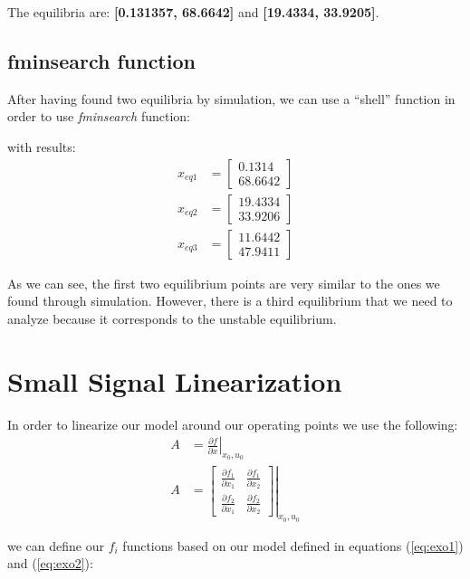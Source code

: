 \documentclass[12pt,letterpaper]{article}
\begin{document}
The equilibria are: \textbf{[0.131357, 68.6642]} and  \textbf{[19.4334, 33.9205]}.
\subsection{fminsearch function}
After having found two equilibria by simulation, we can use a ``shell'' function in order to use 
\textit{fminsearch} function:



with results: 
\begin{align}
    x_{eq1} &= \begin{bmatrix}
        0.1314 \\
        68.6642
    \end{bmatrix} \\
    x_{eq2} &= \begin{bmatrix}
        19.4334 \\
        33.9206
    \end{bmatrix} \\
    x_{eq3} &= \begin{bmatrix}
        11.6442 \\
        47.9411
    \end{bmatrix}
\end{align}

As we can see, the first two equilibrium points are very similar to the ones we found through simulation. 
However, there is a third equilibrium that we need to analyze because it corresponds to the unstable 
equilibrium.

\section{Small Signal Linearization}
In order to linearize our model around our operating points we use the following:
\begin{align}
    A &= \left. \frac{\partial f}{\partial x} \right\rvert_{x_0, u_0} \\
    A &= \left. \begin{bmatrix}
        \frac{\partial f_1}{\partial x_1} & \frac{\partial f_1}{\partial x_2} \\ 
        \frac{\partial f_2}{\partial x_1} & \frac{\partial f_2}{\partial x_2} 
    \end{bmatrix} \right\rvert_{x_0, u_0}
\end{align}

we can define our $f_i$ functions based on our model defined in equations (\ref{eq:exo1}) and (\ref{eq:exo2}):
\end{document}
